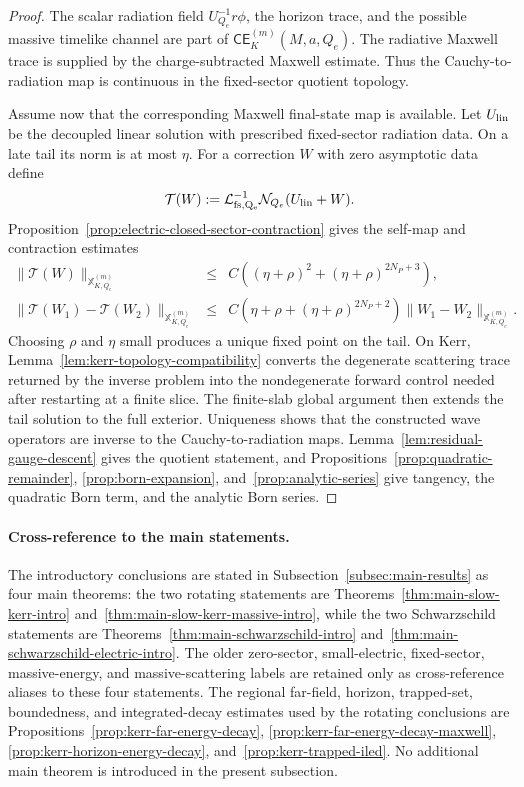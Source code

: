 \documentclass[11pt]{article}
\numberwithin{equation}{section}
\theoremstyle{plain}
\theoremstyle{definition}
\theoremstyle{remark}
\newcommand{\CElec}{\mathsf{CE}}
\begin{document}
\begin{proof}
The scalar radiation field \(U_{Q_e}^{-1}r\phi\), the horizon trace, and the possible massive timelike channel are part of \(\CElec^{(m)}_K(M,a,Q_e)\).  The radiative Maxwell trace is supplied by the charge-subtracted Maxwell estimate.  Thus the Cauchy-to-radiation map is continuous in the fixed-sector quotient topology.

Assume now that the corresponding Maxwell final-state map is available.  Let \(U_{\rm lin}\) be the decoupled linear solution with prescribed fixed-sector radiation data.  On a late tail its norm is at most \(\eta\).  For a correction \(W\) with zero asymptotic data define
\begin{equation}
 \mathcal T(W):=\mathcal L_{\rm fs,Q_e}^{-1}\mathcal N_{Q_e}(U_{\rm lin}+W).
\end{equation}
Proposition~\ref{prop:electric-closed-sector-contraction} gives the self-map and contraction estimates
\begin{eqnarray}
 \|\mathcal T(W)\|_{\mathbb X^{(m)}_{K,Q_e}}&\le&
 C\left((\eta+\rho)^2+(\eta+\rho)^{2N_P+3}\right),\nonumber\\
 \|\mathcal T(W_1)-\mathcal T(W_2)\|_{\mathbb X^{(m)}_{K,Q_e}}&\le&
 C\left(\eta+\rho+(\eta+\rho)^{2N_P+2}\right)
 \|W_1-W_2\|_{\mathbb X^{(m)}_{K,Q_e}}.
\end{eqnarray}
Choosing \(\rho\) and \(\eta\) small produces a unique fixed point on the tail.  On Kerr, Lemma~\ref{lem:kerr-topology-compatibility} converts the degenerate scattering trace returned by the inverse problem into the nondegenerate forward control needed after restarting at a finite slice.  The finite-slab global argument then extends the tail solution to the full exterior.  Uniqueness shows that the constructed wave operators are inverse to the Cauchy-to-radiation maps.  Lemma~\ref{lem:residual-gauge-descent} gives the quotient statement, and Propositions~\ref{prop:quadratic-remainder}, \ref{prop:born-expansion}, and~\ref{prop:analytic-series} give tangency, the quadratic Born term, and the analytic Born series.
\end{proof}


\paragraph{Cross-reference to the main statements.}
The introductory conclusions are stated in Subsection~\ref{subsec:main-results} as four main theorems: the two rotating statements are Theorems~\ref{thm:main-slow-kerr-intro} and~\ref{thm:main-slow-kerr-massive-intro}, while the two Schwarzschild statements are Theorems~\ref{thm:main-schwarzschild-intro} and~\ref{thm:main-schwarzschild-electric-intro}.  The older zero-sector, small-electric, fixed-sector, massive-energy, and massive-scattering labels are retained only as cross-reference aliases to these four statements.  The regional far-field, horizon, trapped-set, boundedness, and integrated-decay estimates used by the rotating conclusions are Propositions~\ref{prop:kerr-far-energy-decay}, \ref{prop:kerr-far-energy-decay-maxwell}, \ref{prop:kerr-horizon-energy-decay}, and~\ref{prop:kerr-trapped-iled}.  No additional main theorem is introduced in the present subsection.
\end{document}
